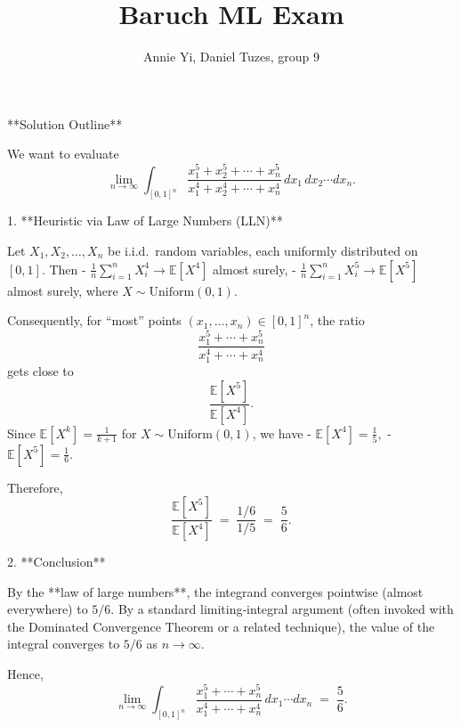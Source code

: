 \documentclass{article}
\title{Baruch ML Exam}
\author{Annie Yi, Daniel Tuzes, group 9}
\begin{document}
\maketitle

\tableofcontents
**Solution Outline**

We want to evaluate  
$$
\lim_{n \to \infty} \int_{[0,1]^n} \frac{x_1^5 + x_2^5 + \cdots + x_n^5}{x_1^4 + x_2^4 + \cdots + x_n^4}\,dx_1\,dx_2 \cdots dx_n.
$$

1. **Heuristic via Law of Large Numbers (LLN)**  

   Let \(X_1, X_2, \dots, X_n\) be i.i.d.\ random variables, each uniformly distributed on \([0,1]\). Then  
   - \(\frac{1}{n}\sum_{i=1}^n X_i^4 \to \mathbb{E}[X^4]\) almost surely,  
   - \(\frac{1}{n}\sum_{i=1}^n X_i^5 \to \mathbb{E}[X^5]\) almost surely,  
   where \(X \sim \mathrm{Uniform}(0,1)\).

   Consequently, for “most” points \((x_1,\dots,x_n) \in [0,1]^n\), the ratio
   $$
   \frac{x_1^5 + \cdots + x_n^5}{x_1^4 + \cdots + x_n^4}
   $$
   gets close to
   $$
   \frac{\mathbb{E}[X^5]}{\mathbb{E}[X^4]}.
   $$
   Since \(\mathbb{E}[X^k] = \tfrac{1}{k+1}\) for \(X \sim \mathrm{Uniform}(0,1)\), we have  
   - \(\mathbb{E}[X^4] = \tfrac{1}{5},\)  
   - \(\mathbb{E}[X^5] = \tfrac{1}{6}.\)

   Therefore,  
   $$
   \frac{\mathbb{E}[X^5]}{\mathbb{E}[X^4]}
   \;=\;
   \frac{1/6}{1/5}
   \;=\;
   \frac{5}{6}.
   $$

2. **Conclusion**  

   By the **law of large numbers**, the integrand converges pointwise (almost everywhere) to \(5/6\). By a standard limiting‐integral argument (often invoked with the Dominated Convergence Theorem or a related technique), the value of the integral converges to \(5/6\) as \(n \to \infty\).

Hence,
$$
\lim_{n \to \infty} \int_{[0,1]^n} \frac{x_1^5 + \cdots + x_n^5}{x_1^4 + \cdots + x_n^4}\,dx_1 \cdots dx_n
\;=\;
\frac{5}{6}.
$$
\end{document}
